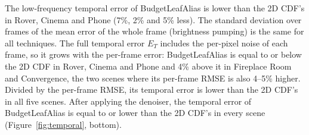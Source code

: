 \documentclass[acmtog,review]{acmart}
\begin{document}
The low-frequency temporal error of BudgetLeafAlias is lower than the 2D CDF's in Rover, Cinema and Phone (7\%, 2\% and 5\% less). The standard deviation over frames of the mean error of the whole frame (brightness pumping) is the same for all techniques. The full temporal error $E_T$ includes the per-pixel noise of each frame, so it grows with the per-frame error: BudgetLeafAlias is equal to or below the 2D CDF in Rover, Cinema and Phone and 4\% above it in Fireplace Room and Convergence, the two scenes where its per-frame RMSE is also 4--5\% higher. Divided by the per-frame RMSE, its temporal error is lower than the 2D CDF's in all five scenes. After applying the denoiser, the temporal error of BudgetLeafAlias is equal to or lower than the 2D CDF's in every scene (Figure~\ref{fig:temporal}, bottom).

\newend
\end{document}

